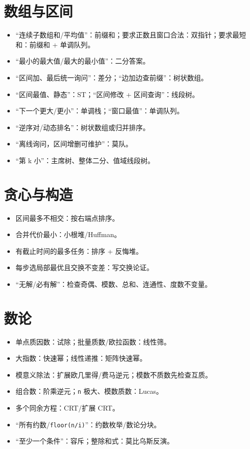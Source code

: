 \section{数组与区间}\label{ux6570ux7ec4ux4e0eux533aux95f4}

\begin{itemize}
\tightlist
\item
  ``连续子数组和/平均值''：前缀和；要求正数且窗口合法：双指针；要求最短和：前缀和 + 单调队列。
\item
  ``最小的最大值/最大的最小值''：二分答案。
\item
  ``区间加、最后统一询问''：差分；``边加边查前缀''：树状数组。
\item
  ``区间最值、静态''：ST；``区间修改 + 区间查询''：线段树。
\item
  ``下一个更大/更小''：单调栈；``窗口最值''：单调队列。
\item
  ``逆序对/动态排名''：树状数组或归并排序。
\item
  ``离线询问，区间增删可维护''：莫队。
\item
  ``第 k 小''：主席树、整体二分、值域线段树。
\end{itemize}

\section{贪心与构造}\label{ux8d2aux5fc3ux4e0eux6784ux9020}

\begin{itemize}
\tightlist
\item
  区间最多不相交：按右端点排序。
\item
  合并代价最小：小根堆/Huffman。
\item
  有截止时间的最多任务：排序 + 反悔堆。
\item
  每步选局部最优且交换不变差：写交换论证。
\item
  ``无解/必有解''：检查奇偶、模数、总和、连通性、度数不变量。
\end{itemize}

\section{数论}\label{ux6570ux8bba}

\begin{itemize}
\tightlist
\item
  单点质因数：试除；批量质数/欧拉函数：线性筛。
\item
  大指数：快速幂；线性递推：矩阵快速幂。
\item
  模意义除法：扩展欧几里得/费马逆元；模数不质数先检查互质。
\item
  组合数：阶乘逆元；\passthrough{\lstinline!n!} 极大、模数质数：Lucas。
\item
  多个同余方程：CRT/扩展 CRT。
\item
  ``所有约数/\passthrough{\lstinline!floor(n/i)!}''：约数枚举/数论分块。
\item
  ``至少一个条件''：容斥；整除和式：莫比乌斯反演。
\end{itemize}

